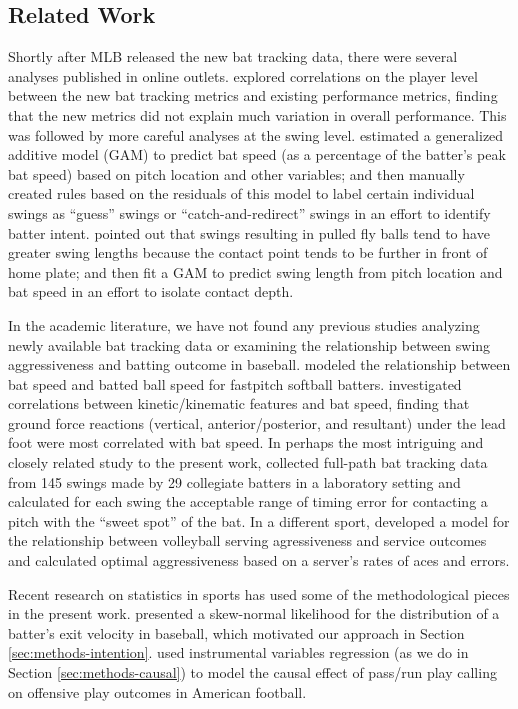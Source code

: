 \documentclass[
  12pt]{article}
\begin{document}
    \subsection{Related Work}
    \label{sec:related-work}

      Shortly after MLB released the new bat tracking data, there were several analyses published in online outlets. \citet{clemens_what_2024} explored correlations on the player level between the new bat tracking metrics and existing performance metrics, finding that the new metrics did not explain much variation in overall performance. This was followed by more careful analyses at the swing level. \citet{woodward_radar_2024} estimated a generalized additive model (GAM) to predict bat speed (as a percentage of the batter's peak bat speed) based on pitch location and other variables; and then manually created rules based on the residuals of this model to label certain individual swings as ``guess'' swings or ``catch-and-redirect'' swings in an effort to identify batter intent. \citet{orr_defense_2024} pointed out that swings resulting in pulled fly balls tend to have greater swing lengths because the contact point tends to be further in front of home plate; and then fit a GAM to predict swing length from pitch location and bat speed in an effort to isolate contact depth.

      In the academic literature, we have not found any previous studies analyzing newly available bat tracking data or examining the relationship between swing aggressiveness and batting outcome in baseball. \citet{nevins_sensitivity_2019} modeled the relationship between bat speed and batted ball speed for fastpitch softball batters. \citet{orishimo_lower_2024} investigated correlations between kinetic/kinematic features and bat speed, finding that ground force reactions (vertical, anterior/posterior, and resultant) under the lead foot were most correlated with bat speed. In perhaps the most intriguing and closely related study to the present work, \citet{nakashima_acceptable_2025} collected full-path bat tracking data from 145 swings made by 29 collegiate batters in a laboratory setting and calculated for each swing the acceptable range of timing error for contacting a pitch with the ``sweet spot'' of the bat. In a different sport, \citet{burton_linear_2015} developed a model for the relationship between volleyball serving agressiveness and service outcomes and calculated optimal aggressiveness based on a server's rates of aces and errors.

      Recent research on statistics in sports has used some of the methodological pieces in the present work. \citet{judge_exit_2024} presented a skew-normal likelihood for the distribution of a batter's exit velocity in baseball, which motivated our approach in Section \ref{sec:methods-intention}. \citet{putman_tackling_2025} used instrumental variables regression (as we do in Section \ref{sec:methods-causal}) to model the causal effect of pass/run play calling on offensive play outcomes in American football.
\end{document}
